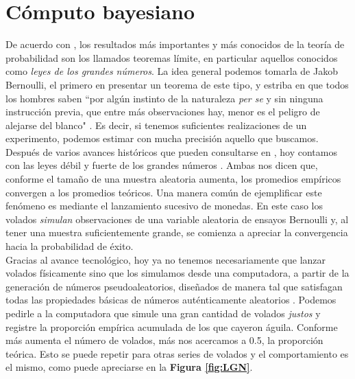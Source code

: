 \chapter{Cómputo bayesiano} \label{chap:Cap_MCMC}

De acuerdo con \textcite{Ross10}, los resultados más importantes y más conocidos de la teoría de probabilidad son los llamados teoremas límite, en particular aquellos conocidos como \textit{leyes de los grandes números}. La idea general podemos tomarla de Jakob Bernoulli, el primero en presentar un teorema de este tipo, y estriba en que todos los hombres saben ``por algún instinto de la naturaleza \textit{per se} y sin ninguna instrucción previa, que entre más observaciones hay, menor es el peligro de alejarse del blanco" \parencite{Pulskamp09}. Es decir, si tenemos suficientes realizaciones de un experimento, podemos estimar con mucha precisión aquello que buscamos.\\

Después de varios avances históricos que pueden consultarse en \textcite{Seneta13}, hoy contamos con las leyes débil y fuerte de los grandes números \parencite{Ross10}. Ambas nos dicen que, conforme el tamaño de una muestra aleatoria aumenta, los promedios empíricos convergen a los promedios teóricos. Una manera común de ejemplificar este fenómeno es mediante el lanzamiento sucesivo de monedas. En este caso los volados \textit{simulan} observaciones de una variable aleatoria de ensayos Bernoulli y, al tener una muestra suficientemente grande, se comienza a apreciar la convergencia hacia la probabilidad de éxito.\\ 

Gracias al avance tecnológico, hoy ya no tenemos necesariamente que lanzar volados físicamente sino que los simulamos desde una computadora, a partir de la generación de números pseudoaleatorios, diseñados de manera tal que satisfagan todas las propiedades básicas de números auténticamente aleatorios \parencite{Ross13}. Podemos pedirle a la computadora que simule una gran cantidad de volados \textit{justos} y registre la proporción empírica acumulada de los que cayeron águila. Conforme más aumenta el número de volados, más nos acercamos a 0.5, la proporción teórica. Esto se puede repetir para otras series de volados y el comportamiento es el mismo, como puede apreciarse en la \textbf{Figura \ref{fig:LGN}}.\\

